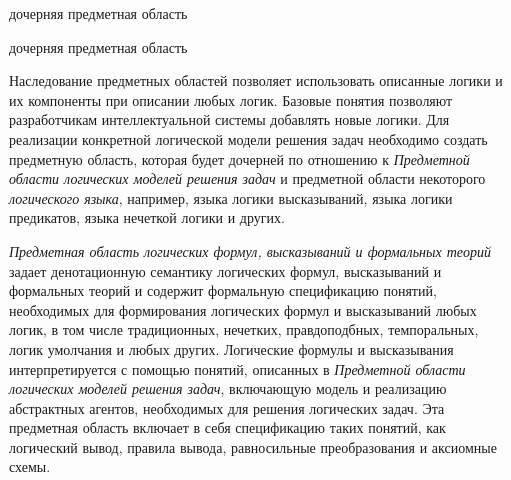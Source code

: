 \begin{SCn}
	\begin{scnrelfromlist}{дочерняя предметная область}
	\end{scnrelfromlist}
	
	\begin{scnindent}
	\end{scnindent}
	
	\begin{scnreltolist}{дочерняя предметная область}
	\end{scnreltolist}
\end{SCn}

Наследование предметных областей позволяет использовать описанные логики и их компоненты при описании любых логик. Базовые понятия позволяют разработчикам интеллектуальной системы добавлять новые логики. Для реализации конкретной логической модели решения задач необходимо создать предметную область, которая будет дочерней по отношению к \textit{Предметной области логических моделей решения задач} и предметной области некоторого \textit{логического языка}, например, языка логики высказываний, языка логики предикатов, языка нечеткой логики и других.

\textit{Предметная область логических формул, высказываний и формальных теорий} задает денотационную семантику логических формул, высказываний и формальных теорий и содержит формальную спецификацию понятий, необходимых для формирования логических формул и высказываний любых логик, в том числе традиционных, нечетких, правдоподбных, темпоральных, логик умолчания и любых других. Логические формулы и высказывания интерпретируется с помощью понятий, описанных в \textit{Предметной области логических моделей решения задач}, включающую модель и реализацию абстрактных агентов, необходимых для решения логических задач. Эта предметная область включает в себя спецификацию таких понятий, как логический вывод, правила вывода, равносильные преобразования и аксиомные схемы.

